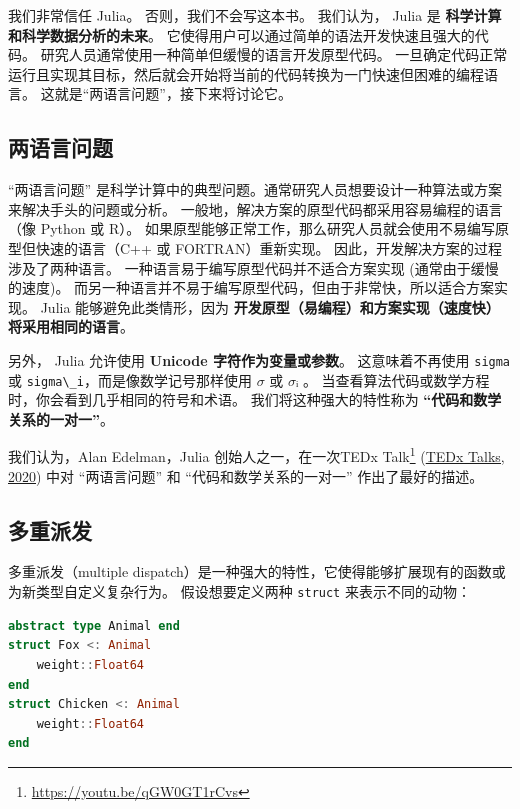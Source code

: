 \documentclass[
  notoc %
]{tufte-book}
\DeclareRobustCommand{\href}[2]{#2\footnote{\url{#1}}}
\newcommand{\passthrough}[1]{#1}
\begin{document}
我们非常信任 Julia。 否则，我们不会写这本书。 我们认为， Julia 是
\textbf{科学计算和科学数据分析的未来}。
它使得用户可以通过简单的语法开发快速且强大的代码。
研究人员通常使用一种简单但缓慢的语言开发原型代码。
一旦确定代码正常运行且实现其目标，然后就会开始将当前的代码转换为一门快速但困难的编程语言。
这就是``两语言问题''，接下来将讨论它。

\hypertarget{sec:two_language}{%
\subsection{两语言问题}\label{sec:two_language}}

``两语言问题''
是科学计算中的典型问题。通常研究人员想要设计一种算法或方案来解决手头的问题或分析。
一般地，解决方案的原型代码都采用容易编程的语言（像 Python 或 R）。
如果原型能够正常工作，那么研究人员就会使用不易编写原型但快速的语言（C++
或 FORTRAN）重新实现。 因此，开发解决方案的过程涉及了两种语言。
一种语言易于编写原型代码并不适合方案实现 (通常由于缓慢的速度)。
而另一种语言并不易于编写原型代码，但由于非常快，所以适合方案实现。 Julia
能够避免此类情形，因为
\textbf{开发原型（易编程）和方案实现（速度快）将采用相同的语言}。

另外， Julia 允许使用 \textbf{Unicode 字符作为变量或参数}。
这意味着不再使用 \passthrough{\lstinline!sigma!} 或
\passthrough{\lstinline!sigma\_i!}，而是像数学记号那样使用 \(σ\) 或
\(σᵢ\) 。 当查看算法代码或数学方程时，你会看到几乎相同的符号和术语。
我们将这种强大的特性称为 \textbf{``代码和数学关系的一对一''}。

我们认为，Alan Edelman，Julia
创始人之一，在一次\href{https://youtu.be/qGW0GT1rCvs}{TEDx Talk}
(\protect\hyperlink{ref-tedxtalksProgrammingLanguageHeal2020}{TEDx
Talks, 2020}) 中对 ``两语言问题'' 和 ``代码和数学关系的一对一''
作出了最好的描述。

\hypertarget{sec:multiple_dispatch}{%
\subsection{多重派发}\label{sec:multiple_dispatch}}

多重派发（multiple
dispatch）是一种强大的特性，它使得能够扩展现有的函数或为新类型自定义复杂行为。
假设想要定义两种 \passthrough{\lstinline!struct!} 来表示不同的动物：

\begin{lstlisting}[language=Julia]
abstract type Animal end
struct Fox <: Animal
    weight::Float64
end
struct Chicken <: Animal
    weight::Float64
end
\end{lstlisting}
\end{document}
